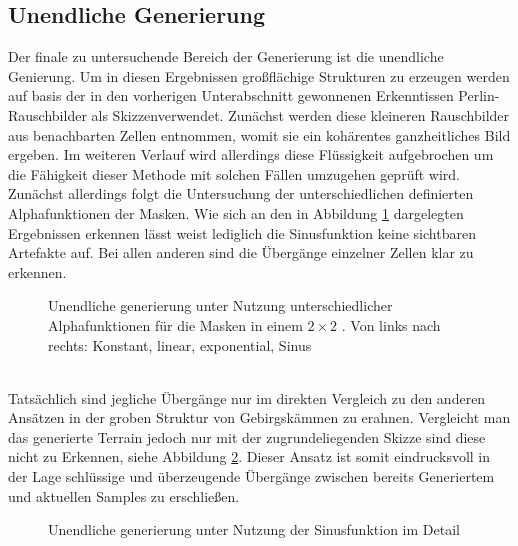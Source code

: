 \subsection {Unendliche Generierung}

Der finale zu untersuchende Bereich der Generierung ist die unendliche Genierung. Um in diesen Ergebnissen großflächige Strukturen zu erzeugen werden auf basis der in den vorherigen Unterabschnitt gewonnenen Erkenntissen Perlin-Rauschbilder als Skizzenverwendet. Zunächst werden diese kleineren Rauschbilder aus benachbarten Zellen entnommen, womit sie ein kohärentes ganzheitliches Bild ergeben. Im weiteren Verlauf wird allerdings diese Flüssigkeit aufgebrochen um die Fähigkeit dieser Methode mit solchen Fällen umzugehen geprüft wird. \\
Zunächst allerdings folgt die Untersuchung der unterschiedlichen definierten Alphafunktionen der Masken. Wie sich an den in Abbildung \ref{fig:masks} dargelegten Ergebnissen erkennen lässt weist lediglich die Sinusfunktion keine sichtbaren Artefakte auf. Bei allen anderen sind die Übergänge einzelner Zellen klar zu erkennen. 
\begin{figure}[htbp]
    \centering
    \caption{Unendliche generierung unter Nutzung unterschiedlicher Alphafunktionen für die Masken in einem $2\times2$ . Von links nach rechts: Konstant, linear, exponential, Sinus}
    \label{fig:masks}
\end{figure} \\
Tatsächlich sind jegliche Übergänge nur im direkten Vergleich zu den anderen Ansätzen in der groben Struktur von Gebirgskämmen zu erahnen. Vergleicht man das generierte Terrain jedoch nur mit der zugrundeliegenden Skizze sind diese nicht zu Erkennen, siehe Abbildung \ref{fig:cos_detail}. Dieser Ansatz ist somit eindrucksvoll in der Lage schlüssige und überzeugende Übergänge zwischen bereits Generiertem und aktuellen Samples zu erschließen.
\begin{figure}[htbp]
    \centering
    \caption{Unendliche generierung unter Nutzung der Sinusfunktion im Detail}
    \label{fig:cos_detail}
\end{figure} \\
